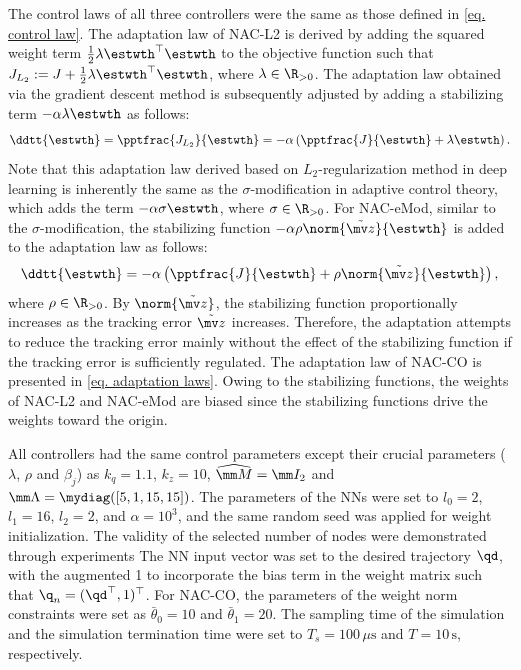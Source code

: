 \documentclass[letterpaper, 10 pt, conference]{ieeeconf}  %
\begin{document}
The control laws of all three controllers were the same as those defined in \eqref{eq. control law}.
The adaptation law of NAC-L2 is derived by adding the squared weight term $\tfrac{1}{2}\lambda{\estwth}^\top {\estwth}$ to the objective function such that $J_{L_2}:= J+\tfrac{1}{2}\lambda{\estwth}^\top {\estwth}$, where $\lambda\in\R_{>0}$.
The adaptation law obtained via the gradient descent method is subsequently adjusted by adding a stabilizing term $-\alpha\lambda{\estwth}$ as follows:
\begin{equation} 
    \ddtt{{\estwth}} = 
    \pptfrac{J_{L_2}}{\estwth}
    =-\alpha
    \left(
        \pptfrac{J}{\estwth}
        +
        \lambda{\estwth}
    \right)
    .
    \label{eq. adap L2}
\end{equation}
Note that this adaptation law derived based on $L_2$-regularization method in deep learning is inherently the same as the $\sigma$-modification in adaptive control theory, which adds the term $-\alpha\sigma{\estwth}$, where $\sigma\in\R_{>0}$.
For NAC-eMod, similar to the $\sigma$-modification, the stabilizing function $-\alpha\rho\norm{\tilde{\mv z}}{\estwth}$ is added to the adaptation law as follows:
\begin{equation}
    \ddtt{{\estwth}} = -\alpha
    \left(
        \pptfrac{J}{\estwth}
        +
        \rho\norm{\tilde {\mv z}}{\estwth}
    \right)
    ,
    \label{eq. adap eMod}
\end{equation}
where $\rho\in\R_{>0}$.
By $\norm{\tilde {\mv z}}$, the stabilizing function proportionally increases as the tracking error $\tilde {\mv z}$ increases.
Therefore, the adaptation attempts to reduce the tracking error mainly without the effect of the stabilizing function if the tracking error is sufficiently regulated.
The adaptation law of NAC-CO is presented in \eqref{eq. adaptation laws}.
Owing to the stabilizing functions, the weights of NAC-L2 and NAC-eMod are biased since the stabilizing functions drive the weights toward the origin.

All controllers had the same control parameters except their crucial parameters (\ie $\lambda$, $\rho$ and $\beta_j$) as $k_q=1.1$, $k_z=10$, $\widehat{\mm M}=\mm I_2$ and $\mm \Lambda=\mydiag([5,1,15,15])$.
The parameters of the NNs were set to $l_0=2$, $l_1=16$, $l_2=2$, and $\alpha=10^3$, and the same random seed was applied for weight initialization.
The validity of the selected number of nodes were demonstrated through experiments 
The NN input vector was set to the desired trajectory $\qd$, with the augmented 1 to incorporate the bias term in the weight matrix such that $\q_{n}=(\qd^\top ,1)^\top $.
For NAC-CO, the parameters of the weight norm constraints were set as $\bar\theta_0=10$ and $\bar\theta_1=20$.
The sampling time of the simulation and the simulation termination time were set to $T_s=100\,\mu\mathrm{s}$ and $T=10\,\mathrm{s}$, respectively.
\end{document}
